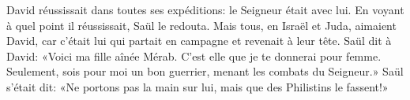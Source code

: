 David réussissait dans toutes ses expéditions:
	le Seigneur était avec lui.
	En voyant à quel point il réussissait, Saül le redouta.
Mais tous, en Israël et Juda, aimaient David,
	car c’était lui qui partait en campagne et revenait à leur tête.
Saül dit à David: «Voici ma fille aînée Mérab.
	C’est elle que je te donnerai pour femme.
	Seulement, sois pour moi un bon guerrier, menant les combats du Seigneur.»
Saül s’était dit:
	«Ne portons pas la main sur lui, mais que des Philistins le fassent!»
